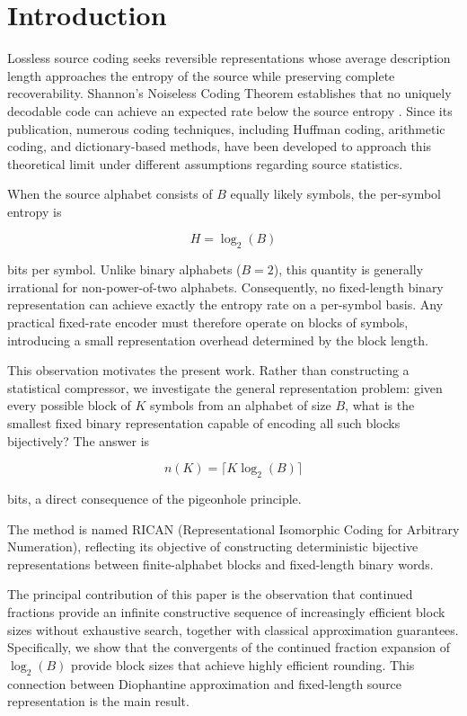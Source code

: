 \documentclass[10pt, conference]{IEEEtran}
\begin{document}
\section{Introduction}

Lossless source coding seeks reversible representations whose average description length approaches the entropy of the source while preserving complete recoverability. Shannon's Noiseless Coding Theorem establishes that no uniquely decodable code can achieve an expected rate below the source entropy \cite{shannon}. Since its publication, numerous coding techniques, including Huffman coding, arithmetic coding, and dictionary-based methods, have been developed to approach this theoretical limit under different assumptions regarding source statistics.

When the source alphabet consists of \(B\) equally likely symbols, the per-symbol entropy is

\[
H = \log_2(B)
\]

bits per symbol. Unlike binary alphabets ($B=2$), this quantity is generally irrational for non-power-of-two alphabets. Consequently, no fixed-length binary representation can achieve exactly the entropy rate on a per-symbol basis. Any practical fixed-rate encoder must therefore operate on blocks of symbols, introducing a small representation overhead determined by the block length.

This observation motivates the present work. Rather than constructing a statistical compressor, we investigate the general representation problem: given every possible block of \(K\) symbols from an alphabet of size \(B\), what is the smallest fixed binary representation capable of encoding all such blocks bijectively? The answer is

\[
n(K) = \lceil K\log_2(B)\rceil
\]

bits, a direct consequence of the pigeonhole principle.

The method is named RICAN (Representational Isomorphic Coding for Arbitrary Numeration), reflecting its objective of constructing deterministic bijective representations between finite-alphabet blocks and fixed-length binary words.

The principal contribution of this paper is the observation that continued fractions provide an infinite constructive sequence of increasingly efficient block sizes without exhaustive search, together with classical approximation guarantees. Specifically, we show that the convergents of the continued fraction expansion of \(\log_2(B)\) provide block sizes that achieve highly efficient rounding. This connection between Diophantine approximation and fixed-length source representation is the main result.
\end{document}
